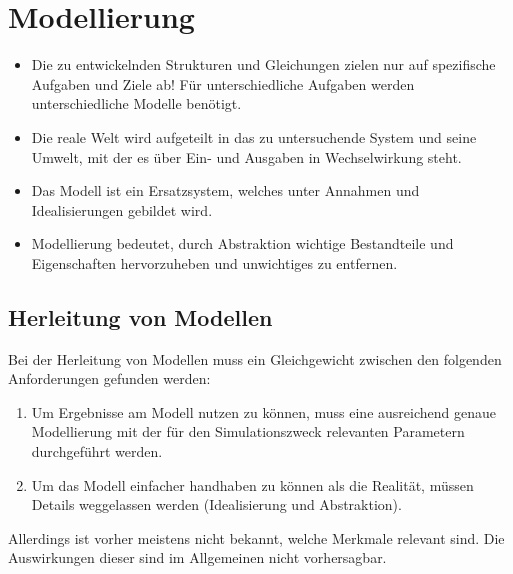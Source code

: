 \documentclass[a4paper, 11pt, accentcolor = tud3b]{tudreport}
\begin{document}
        \section{Modellierung} %
	        \label{sec:sim_modelling}
        
	        \begin{itemize}
	        	\item Die zu entwickelnden Strukturen und Gleichungen zielen nur auf spezifische Aufgaben und Ziele ab! Für unterschiedliche Aufgaben werden unterschiedliche Modelle benötigt.
	        	\item Die reale Welt wird aufgeteilt in das zu untersuchende System und seine Umwelt, mit der es über Ein- und Ausgaben in Wechselwirkung steht.
	        	\item Das Modell ist ein Ersatzsystem, welches unter Annahmen und Idealisierungen gebildet wird.
	        	\item Modellierung bedeutet, durch Abstraktion wichtige Bestandteile und Eigenschaften hervorzuheben und unwichtiges zu entfernen.
	        \end{itemize}

            \subsection{Herleitung von Modellen} %
                Bei der Herleitung von Modellen muss ein Gleichgewicht zwischen den folgenden Anforderungen gefunden werden:
                \begin{enumerate}
                	\item Um Ergebnisse am Modell nutzen zu können, muss eine ausreichend genaue Modellierung mit der für den Simulationszweck relevanten Parametern durchgeführt werden.
                	\item Um das Modell einfacher handhaben zu können als die Realität, müssen Details weggelassen werden (Idealisierung und Abstraktion).
                \end{enumerate}
                Allerdings ist vorher meistens nicht bekannt, welche Merkmale relevant sind. Die Auswirkungen dieser sind im Allgemeinen nicht vorhersagbar.
                
\end{document}
